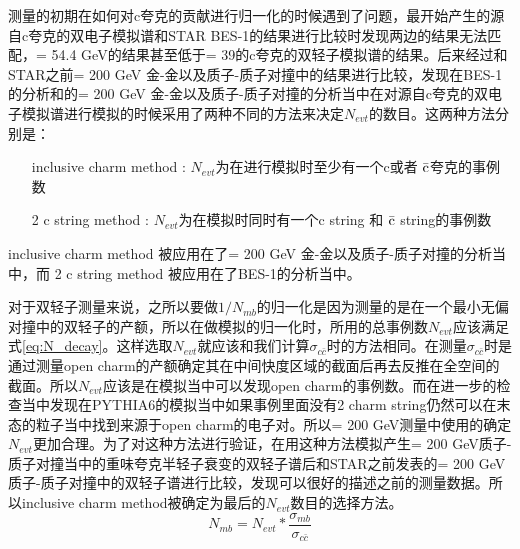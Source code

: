 测量的初期在如何对c夸克的贡献进行归一化的时候遇到了问题，最开始产生的源自c夸克的双电子模拟谱和STAR BES-1的结果进行比较时发现两边的结果无法匹配，\sNN = 54.4 GeV的结果甚至低于\sNN = 39的c夸克的双轻子模拟谱的结果。后来经过和STAR之前\sNN = 200 GeV 金-金以及质子-质子对撞中的结果进行比较，发现在BES-1的分析和的\sNN = 200 GeV 金-金以及质子-质子对撞的分析当中在对源自c夸克的双电子模拟谱进行模拟的时候采用了两种不同的方法来决定$N_{evt}$的数目。这两种方法分别是：
\begin{itemize}
    \item[inclusive charm method] : $N_{evt}$为在进行模拟时至少有一个c或者 ${\rm \bar{c}}$夸克的事例数
    \item[2 c string method] : $N_{evt}$为在模拟时同时有一个c string 和 ${\rm \bar{c}}$ string的事例数 
\end{itemize}
inclusive charm method 被应用在了\sNN = 200 GeV 金-金以及质子-质子对撞的分析当中，而 2 c string method 被应用在了BES-1的分析当中。

对于双轻子测量来说，之所以要做$1/N_{mb}$的归一化是因为测量的是在一个最小无偏对撞中的双轻子的产额，所以在做模拟的归一化时，所用的总事例数$N_{evt}$应该满足式\ref{eq:N_decay}。这样选取$N_{evt}$就应该和我们计算$\sigma_{c\bar{c}}$时的方法相同。在测量$\sigma_{c\bar{c}}$时是通过测量open charm的产额确定其在中间快度区域的截面后再去反推在全空间的截面。所以$N_{evt}$应该是在模拟当中可以发现open charm的事例数。而在进一步的检查当中发现在PYTHIA6的模拟当中如果事例里面没有2 charm string仍然可以在末态的粒子当中找到来源于open charm的电子对。所以\sNN = 200 GeV测量中使用的确定$N_{evt}$更加合理。为了对这种方法进行验证，在用这种方法模拟产生\sNN = 200 GeV质子-质子对撞当中的重味夸克半轻子衰变的双轻子谱后和STAR之前发表的\sNN = 200 GeV质子-质子对撞中的双轻子谱进行比较，发现可以很好的描述之前的测量数据。所以inclusive charm method被确定为最后的$N_{evt}$数目的选择方法。
\begin{equation}
    \label{eq:N_decay}
    N_{mb} = N_{evt}*\frac{\sigma_{mb}}{\sigma_{c\bar{c}}}
\end{equation}
